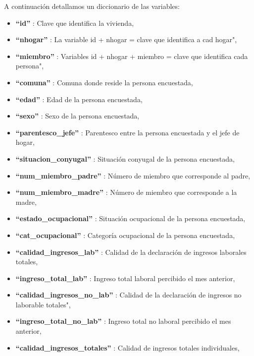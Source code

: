 \documentclass[a4paper]{article}
\begin{document}
    A continuación detallamos un diccionario de las variables:
    \begin{itemize}
        \item \textbf{``id''}                            : Clave que identifica la vivienda,
        \item \textbf{``nhogar''}                        : La variable id + nhogar = clave que identifica a cad hogar",
        \item \textbf{``miembro''}                       : Variables id + nhogar + miembro = clave que identifica  cada persona",
        \item \textbf{``comuna''}                        : Comuna donde reside la persona encuestada,
        \item \textbf{``edad''}                          : Edad de la persona encuestada,
        \item \textbf{``sexo''}                          : Sexo de la persona encuestada,
        \item \textbf{``parentesco\_jefe''}              : Parentesco entre la persona encuestada y el jefe de hogar,
        \item \textbf{``situacion\_conyugal''}           : Situación conyugal de la persona encuestada,
        \item \textbf{``num\_miembro\_padre''}           : Número de miembro que corresponde al padre,
        \item \textbf{``num\_miembro\_madre''}           : Número de miembro que corresponde a la madre,
        \item \textbf{``estado\_ocupacional''}           : Situación ocupacional de la persona encuestada,
        \item \textbf{``cat\_ocupacional''}              : Categoría ocupacional de la persona encuestada,
        \item \textbf{``calidad\_ingresos\_lab''}        : Calidad de la declaración de ingresos laborales totales,
        \item \textbf{``ingreso\_total\_lab''}           : Ingreso total laboral percibido el mes anterior,
        \item \textbf{``calidad\_ingresos\_no\_lab''}    : Calidad de la declaración de ingresos no laborable totales",
        \item \textbf{``ingreso\_total\_no\_lab''}       : Ingreso total no laboral percibido el mes anterior,
        \item \textbf{``calidad\_ingresos\_totales''}    : Calidad de ingresos totales individuales,

\end{itemize}
\end{document}
